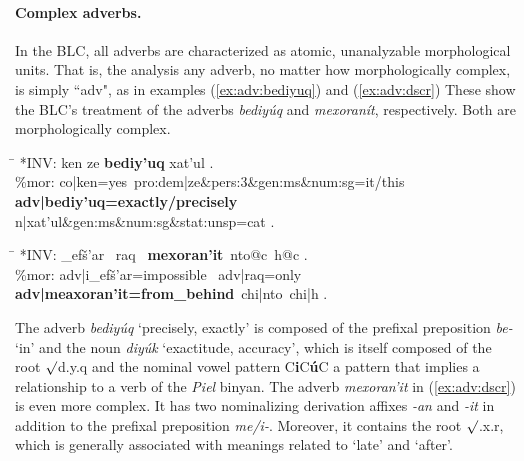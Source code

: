 \paragraph{Complex adverbs.} In the \ac{BLC}, all adverbs are characterized as atomic, unanalyzable morphological units. That is,
the analysis any adverb, no matter how morphologically complex, is simply ``adv", as in 
examples (\ref{ex:adv:bediyuq}) and (\ref{ex:adv:dscr})  These show the \ac{BLC}'s treatment of the adverbs \textit{\textsf{bediy\'{u}q}} and \textit{\textsf{mexoran\'{i}t}}, respectively. Both are 
morphologically complex.

\begin{exe}
\ex \label{ex:adv:bediyuq}
	\begin{tabbing}
	\hspace{0.6in} \= \hspace{5.5in} \kill
	\textsf{*INV:} \> \textsf{ken ze \textbf{bediy\a'{u}q} xat\a'{u}l .} \\
	\textsf{\%mor:} \> \textsf{co|ken=yes\, pro:dem|ze\&pers:3\&gen:ms\&num:sg=it/this} \\
				\> \textsf{\textbf{adv|bediy\a'{u}q=exactly/precisely}} \\
				\> \textsf{n|xat\a'{u}l\&gen:ms\&num:sg\&stat:unsp=cat .}
	\end{tabbing}
\ex \label{ex:adv:dscr}
	\begin{tabbing}
	\hspace{0.6in} \= \hspace{5.5in} \kill
	\textsf{*INV:} \> \textsf{\_{\textglotstop}{e}f\v{s}\a'{a}r \, raq \, \textbf{mexoran\a'{i}t}\, 
		nto@c\, h@c .} \\
	\textsf{\%mor:} \> \textsf{adv|{\textglotstop}i\_{\textglotstop}ef\v{s}\a'{a}r=impossible \, adv|raq=only}\\
	 \> \textsf{\textbf{adv|me{\textglotstop}axoran\a'{i}t=from\_behind}\, chi|nto\, chi|h .}
	\end{tabbing}
\end{exe}

The adverb \textit{bediy\'uq} `precisely, exactly'
is composed of the prefixal preposition \textit{be-} `in' and the 
noun \textit{diy\'uk} `exactitude, accuracy', which is itself composed of the 
root $\surd$d.y.q and the nominal vowel pattern C\textbf{i}C\textbf{\'u}C 
a pattern that implies a relationship to a verb of the \textit{Piel} binyan.  
The adverb \textit{\textsf{mexoran\a'{i}t}} in 
(\ref{ex:adv:dscr}) is even more complex. It has two nominalizing
derivation affixes \textit{\textsf{-an}} and \textit{\textsf{-it}} in addition 
to the prefixal preposition \textit{\textsf{me/i-}}. Moreover, it contains the 
root $\surd$\textsf{.x.r}, which is generally associated with meanings 
related to `late' and `after'.


